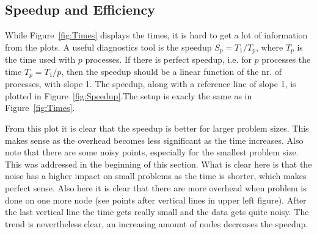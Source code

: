 \subsection{Speedup and Efficiency}
While Figure~\ref{fig:Times} displays the times, it is hard to get a lot of information from the plots. A useful diagnostics tool is the speedup $S_p=T_1/T_p$, where $T_p$ is the time used with $p$ processes. If there is perfect speedup, i.e. for $p$ processes the time $T_p = T_1/p$, then the speedup should be a linear function of the nr. of processes, with slope 1. The speedup, along with a reference line of slope 1, is plotted in Figure~\ref{fig:Speedup}.The setup is exacly the same as in Figure~\ref{fig:Times}.

From this plot it is clear that the speedup is better for larger problem sizes. This makes sense as the overhead becomes less significant as the time increases. Also note that there are some noisy points, especially for the smallest problem size. This was addressed in the beginning of this section. What is clear here is that the noise has a higher impact on small problems as the time is shorter, which makes perfect sense. Also here it is clear that there are more overhead when problem is done on one more node (see points after vertical lines in upper left figure). After the last vertical line the time gets really small and the data gets quite noisy.
The trend is nevertheless clear, an increasing amount of nodes decreases the speedup. \\
%
